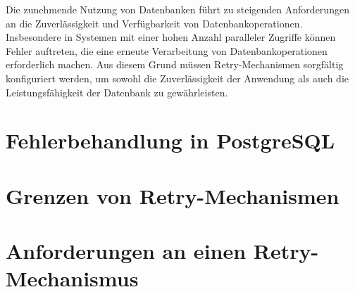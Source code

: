 
Die zunehmende Nutzung von Datenbanken führt zu steigenden Anforderungen an die Zuverlässigkeit und Verfügbarkeit
von Datenbankoperationen.
Insbesondere in Systemen mit einer hohen Anzahl paralleler Zugriffe können Fehler auftreten, die eine erneute
Verarbeitung von Datenbankoperationen erforderlich machen.
Aus diesem Grund müssen Retry-Mechanismen sorgfältig konfiguriert werden, um sowohl die Zuverlässigkeit der
Anwendung als auch die Leistungsfähigkeit der Datenbank zu gewährleisten.

\section{Fehlerbehandlung in PostgreSQL}
\label{sec:errorhandlingPostgreSQL}


\section{Grenzen von Retry-Mechanismen}
\label{sec:limitationOfRetry}


\section{Anforderungen an einen Retry-Mechanismus}
\label{sec:requirements}

